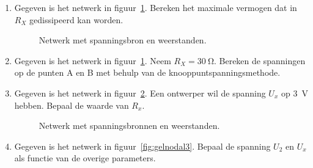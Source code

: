 \begin{enumerate}[labelindent=0pt,labelwidth=\widthof{8.88.\ },label=\textbf{\thechapter.\arabic*.},leftmargin=!,ref=\thechapter.\arabic*]
\item
\label{que:gelthevenin3}
Gegeven is het netwerk in figuur~\ref{fig:gelnetwerkvoortheveninanalysis3}. Bereken het maximale vermogen dat in $R_X$ gedissipeerd kan worden.

\begin{figure}[!ht]
\centering
{}
\caption{Netwerk met spanningsbron en weerstanden.}
\label{fig:gelnetwerkvoortheveninanalysis3}
\end{figure}

\item
\label{que:gelnodal1}
Gegeven is het netwerk in figuur~\ref{fig:gelnetwerkvoortheveninanalysis3}. Neem $R_X=\SI{30}{\ohm}$. Bereken de spanningen op de punten A en B met behulp van de knooppuntspanningsmethode.


\item
\label{que:gelnodal2}
Gegeven is het netwerk in figuur~\ref{fig:gelnodal2}. Een ontwerper wil de spanning $U_x$ op \SI{3}{\volt} hebben.
Bepaal de waarde van $R_x$.

\begin{figure}[!ht]
\centering
{}
\caption{Netwerk met spanningsbronnen en weerstanden.}
\label{fig:gelnodal2}
\end{figure}


\item
\label{que:nodal3}
Gegeven is het netwerk in figuur~\ref{fig:gelnodal3}. Bepaal de spanning $U_2$ en $U_x$ als functie van de overige parameters.


\end{enumerate}
